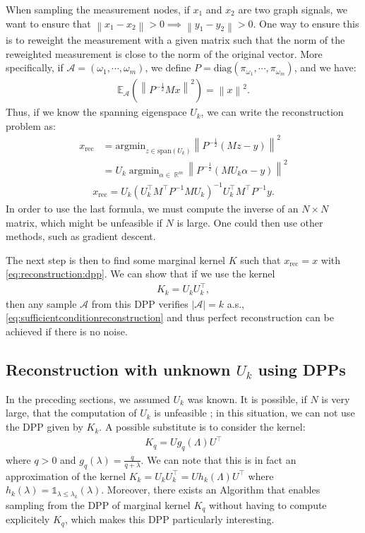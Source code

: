\documentclass{article}
\newcommand{\abs} [1] {\left| #1 \right|}
\newcommand{\norm}[1]{\left\|#1\right\|}
\DeclareMathOperator{\R}{\mathbb{R}}
\begin{document}
When sampling the measurement nodes, if $x_1$ and $x_2$ are two graph signals, we want to ensure that $\norm{x_1 - x_2} > 0 \implies \norm{y_1 - y_2} > 0$. One way to ensure this is to reweight the measurement with a given matrix such that the norm of the reweighted measurement is close to the norm of the original vector. More specifically, if $\mathcal{A} = (\omega_1, \cdots, \omega_m)$, we define $P = \mathrm{diag}(\pi_{\omega_1}, \cdots, \pi_{\omega_m})$, and we have:
\begin{align} \mathbb{E}_\mathcal{A} \left( \norm{P^{-\frac{1}{2}} M x}^2 \right) = \norm{x}^2. \label{eq:esp_reweighted_norm}\end{align}
Thus, if we know the spanning eigenspace $U_k$, we can write the reconstruction problem as:
\begin{align*} x_{\text{rec}} &= \mathrm{argmin}_{z \in \mathrm{span}(U_k)} \norm{P^{-\frac{1}{2}} \left( M z - y \right)}^2 \\
&= U_k \; \mathrm{argmin}_{\alpha \in \R^m} \norm{P^{-\frac{1}{2}} \left( M U_k \alpha - y \right)}^2 \end{align*}
\begin{align} \boxed{x_\text{rec} = U_k (U_k^\top M^\top P^{-1} M U_k)^{-1} U_k^\top M^\top P^{-1} y}. \label{eq:reconstruction:dpp} \end{align}
In order to use the last formula, we must compute the inverse of an $N \times N$ matrix, which might be unfeasible if $N$ is large. One could then use other methods, such as gradient descent.


The next step is then to find some marginal kernel $K$ such that $x_\text{rec} = x$ with \eqref{eq:reconstruction:dpp}. We can show that if we use the kernel 
\begin{align} \boxed{K_k = U_k U_k^\top}, \label{eq:def:Kk}\end{align}
then any sample $\mathcal{A}$ from this DPP verifies $\abs{\mathcal{A}} = k$ a.s., \eqref{eq:sufficientconditionreconstruction} and thus perfect reconstruction can be achieved if there is no noise.


\subsection[Reconstruction with unknown Uk using DPPs]{Reconstruction with unknown $U_k$ using DPPs}


In the preceding sections, we assumed $U_k$ was known. It is possible, if $N$ is very large, that the computation of $U_k$ is unfeasible ; in this situation, we can not use the DPP given by $K_k$. A possible substitute is to consider the kernel:
\begin{align} \boxed{K_q = U g_q(\Lambda) U^\top} \label{eq:def:Kq}\end{align}
where $q > 0$ and $g_q(\lambda) = \frac{q}{q + \lambda}$. We can note that this is in fact an approximation of the kernel $K_k = U_k U_k^\top = U h_k(\Lambda) U^\top$ where $h_k(\lambda) = \mathds{1}_{\lambda \leq \lambda_k} (\lambda)$. Moreover, there exists an Algorithm that enables sampling from the DPP of marginal kernel $K_q$ without having to compute explicitely $K_q$, which makes this DPP particularly interesting.
\end{document}
